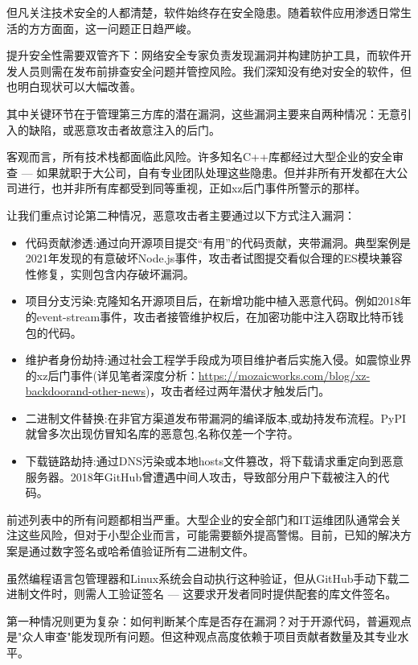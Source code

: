 
但凡关注技术安全的人都清楚，软件始终存在安全隐患。随着软件应用渗透日常生活的方方面面，这一问题正日趋严峻。

提升安全性需要双管齐下：网络安全专家负责发现漏洞并构建防护工具，而软件开发人员则需在发布前排查安全问题并管控风险。我们深知没有绝对安全的软件，但也明白现状可以大幅改善。

其中关键环节在于管理第三方库的潜在漏洞，这些漏洞主要来自两种情况：无意引入的缺陷，或恶意攻击者故意注入的后门。

客观而言，所有技术栈都面临此风险。许多知名C++库都经过大型企业的安全审查 --- 如果就职于大公司，自有专业团队处理这些隐患。但并非所有开发都在大公司进行，也并非所有库都受到同等重视，正如xz后门事件所警示的那样。

让我们重点讨论第二种情况，恶意攻击者主要通过以下方式注入漏洞：

\begin{itemize}
\item 
代码贡献渗透:通过向开源项目提交“有用”的代码贡献，夹带漏洞。典型案例是2021年发现的有意破坏Node.js事件，攻击者试图提交看似合理的ES模块兼容性修复，实则包含内存破坏漏洞。

\item 
项目分支污染:克隆知名开源项目后，在新增功能中植入恶意代码。例如2018年的event-stream事件，攻击者接管维护权后，在加密功能中注入窃取比特币钱包的代码。

\item 
维护者身份劫持:通过社会工程学手段成为项目维护者后实施入侵。如震惊业界的xz后门事件(详见笔者深度分析：\url{https://mozaicworks.com/blog/xz-backdoorand-other-news})，攻击者经过两年潜伏才触发后门。

\item 
二进制文件替换:在非官方渠道发布带漏洞的编译版本,或劫持发布流程。PyPI就曾多次出现仿冒知名库的恶意包,名称仅差一个字符。

\item 
下载链路劫持:通过DNS污染或本地hosts文件篡改，将下载请求重定向到恶意服务器。2018年GitHub曾遭遇中间人攻击，导致部分用户下载被注入的代码。
\end{itemize}

前述列表中的所有问题都相当严重。大型企业的安全部门和IT运维团队通常会关注这些风险，但对于小型企业而言，可能需要额外提高警惕。目前，已知的解决方案是通过数字签名或哈希值验证所有二进制文件。

虽然编程语言包管理器和Linux系统会自动执行这种验证，但从GitHub手动下载二进制文件时，则需人工验证签名 --- 这要求开发者同时提供配套的库文件签名。

第一种情况则更为复杂：如何判断某个库是否存在漏洞？对于开源代码，普遍观点是"众人审查"能发现所有问题。但这种观点高度依赖于项目贡献者数量及其专业水平。

